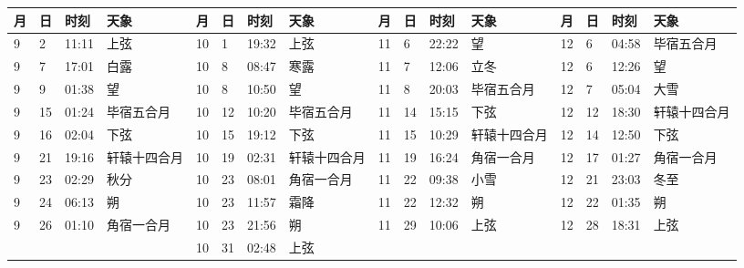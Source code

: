 \begin{tabular}{llll|llll|llll|llll}
\hline
	月 & 日 & 时刻 & 天象 &
	月 & 日 & 时刻 & 天象 &
	月 & 日 & 时刻 & 天象 &
	月 & 日 & 时刻 & 天象 \tabularnewline
\hline
9 & 2 & 11:11 & 上弦 & 10 & 1 & 19:32 & 上弦 & 11 & 6 & 22:22 & 望 & 12 & 6 & 04:58 & 毕宿五合月 \tabularnewline
9 & 7 & 17:01 & 白露 & 10 & 8 & 08:47 & 寒露 & 11 & 7 & 12:06 & 立冬 & 12 & 6 & 12:26 & 望 \tabularnewline
9 & 9 & 01:38 & 望 & 10 & 8 & 10:50 & 望 & 11 & 8 & 20:03 & 毕宿五合月 & 12 & 7 & 05:04 & 大雪 \tabularnewline
9 & 15 & 01:24 & 毕宿五合月 & 10 & 12 & 10:20 & 毕宿五合月 & 11 & 14 & 15:15 & 下弦 & 12 & 12 & 18:30 & 轩辕十四合月 \tabularnewline
9 & 16 & 02:04 & 下弦 & 10 & 15 & 19:12 & 下弦 & 11 & 15 & 10:29 & 轩辕十四合月 & 12 & 14 & 12:50 & 下弦 \tabularnewline
9 & 21 & 19:16 & 轩辕十四合月 & 10 & 19 & 02:31 & 轩辕十四合月 & 11 & 19 & 16:24 & 角宿一合月 & 12 & 17 & 01:27 & 角宿一合月 \tabularnewline
9 & 23 & 02:29 & 秋分 & 10 & 23 & 08:01 & 角宿一合月 & 11 & 22 & 09:38 & 小雪 & 12 & 21 & 23:03 & 冬至 \tabularnewline
9 & 24 & 06:13 & 朔 & 10 & 23 & 11:57 & 霜降 & 11 & 22 & 12:32 & 朔 & 12 & 22 & 01:35 & 朔 \tabularnewline
9 & 26 & 01:10 & 角宿一合月 & 10 & 23 & 21:56 & 朔 & 11 & 29 & 10:06 & 上弦 & 12 & 28 & 18:31 & 上弦 \tabularnewline
 &  &  &  & 10 & 31 & 02:48 & 上弦 &  &  &  &  &  &  &  &  \tabularnewline
\hline \end{tabular}
